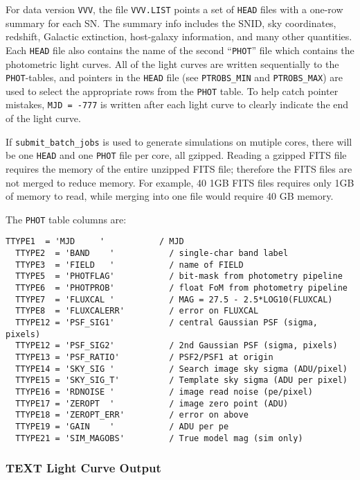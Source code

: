 \documentclass[12pt]{article}
\begin{document}
For data version {\tt VVV}, the file {\tt VVV.LIST} points 
a set of {\tt HEAD} files with a one-row summary for each SN.
The summary info includes the SNID, sky coordinates, redshift,
Galactic extinction, host-galaxy information, and many other quantities.
Each {\tt HEAD} file also contains the name of the second 
``{\tt PHOT}'' file which contains the photometric light curves.
All of the light curves are written sequentially to the
{\tt PHOT}-tables, and pointers in the {\tt HEAD} file 
(see {\tt PTROBS\_MIN} and {\tt PTROBS\_MAX}) 
are used to select the appropriate rows from the {\tt PHOT} table.
To help catch pointer mistakes, {\tt MJD = -777} is written
after each light curve to clearly indicate the end of the light curve.


If {\tt submit\_batch\_jobs} is used to generate simulations on mutiple cores,
there will be one {\tt HEAD} and one {\tt PHOT} file per core, all gzipped. 
Reading a gzipped FITS file requires the memory of the entire unzipped FITS
file; therefore the FITS files are not merged to reduce memory.
For example, 40 1GB FITS files requires only 1GB of memory to read,
while merging into one file would require 40 GB memory.

The {\tt PHOT} table columns are:
\begin{Verbatim}[frame=single]
  TTYPE1  = 'MJD     '           / MJD
  TTYPE2  = 'BAND    '           / single-char band label
  TTYPE3  = 'FIELD   '           / name of FIELD
  TTYPE5  = 'PHOTFLAG'           / bit-mask from photometry pipeline
  TTYPE6  = 'PHOTPROB'           / float FoM from photometry pipeline
  TTYPE7  = 'FLUXCAL '           / MAG = 27.5 - 2.5*LOG10(FLUXCAL)
  TTYPE8  = 'FLUXCALERR'         / error on FLUXCAL  
  TTYPE12 = 'PSF_SIG1'           / central Gaussian PSF (sigma, pixels)
  TTYPE12 = 'PSF_SIG2'           / 2nd Gaussian PSF (sigma, pixels)
  TTYPE13 = 'PSF_RATIO'          / PSF2/PSF1 at origin
  TTYPE14 = 'SKY_SIG '           / Search image sky sigma (ADU/pixel) 
  TTYPE15 = 'SKY_SIG_T'          / Template sky sigma (ADU per pixel)
  TTYPE16 = 'RDNOISE '           / image read noise (pe/pixel)
  TTYPE17 = 'ZEROPT  '           / image zero point (ADU)
  TTYPE18 = 'ZEROPT_ERR'         / error on above
  TTYPE19 = 'GAIN    '           / ADU per pe
  TTYPE21 = 'SIM_MAGOBS'         / True model mag (sim only)
\end{Verbatim}

   \subsubsection{TEXT Light Curve Output }
   \label{sss:text_format}
\end{document}

